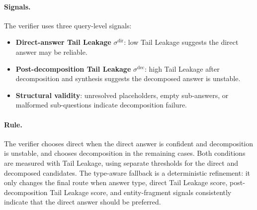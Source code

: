 \paragraph{Signals.} The verifier uses three query-level signals:

\begin{itemize}
    \item \textbf{Direct-answer Tail Leakage} $\sigma^{\mathrm{dir}}$: low Tail Leakage suggests the direct answer may be reliable.
    \item \textbf{Post-decomposition Tail Leakage} $\sigma^{\mathrm{dec}}$: high Tail Leakage after decomposition and synthesis suggests the decomposed answer is unstable.
    \item \textbf{Structural validity}: unresolved placeholders, empty sub-answers, or malformed sub-questions indicate decomposition failure.
\end{itemize}

\paragraph{Rule.} The verifier chooses direct when the direct answer is confident and decomposition is unstable, and chooses decomposition in the remaining cases. Both conditions are measured with Tail Leakage, using separate thresholds for the direct and decomposed candidates. The type-aware fallback is a deterministic refinement: it only changes the final route when answer type, direct Tail Leakage score, post-decomposition Tail Leakage score, and entity-fragment signals consistently indicate that the direct answer should be preferred.
